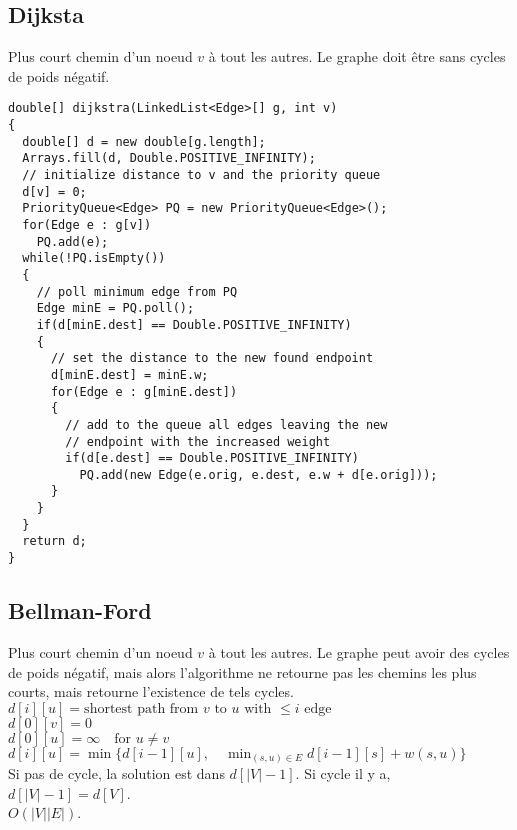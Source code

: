 \subsection{Dijksta}
Plus court chemin d'un noeud $v$ à tout les autres. Le graphe doit être sans cycles de poids négatif.\\

\begin{lstlisting}
double[] dijkstra(LinkedList<Edge>[] g, int v)
{
  double[] d = new double[g.length];
  Arrays.fill(d, Double.POSITIVE_INFINITY);
  // initialize distance to v and the priority queue
  d[v] = 0;
  PriorityQueue<Edge> PQ = new PriorityQueue<Edge>();
  for(Edge e : g[v])
    PQ.add(e);
  while(!PQ.isEmpty())
  {
    // poll minimum edge from PQ
    Edge minE = PQ.poll();
    if(d[minE.dest] == Double.POSITIVE_INFINITY)
    {
      // set the distance to the new found endpoint
      d[minE.dest] = minE.w;
      for(Edge e : g[minE.dest])
      {
        // add to the queue all edges leaving the new
        // endpoint with the increased weight
        if(d[e.dest] == Double.POSITIVE_INFINITY)
          PQ.add(new Edge(e.orig, e.dest, e.w + d[e.orig]));
      }
    }
  }
  return d;
}
\end{lstlisting}
\subsection{Bellman-Ford\label{BellmanFord}}
Plus court chemin d'un noeud $v$ à tout les autres. Le graphe peut avoir des cycles de poids négatif, mais alors l'algorithme ne retourne pas les chemins les plus courts, mais retourne l'existence de tels cycles.\\
$d[i][u] = \text{shortest path from $v$ to $u$ with $\leq i$ edge}$\\
$d[0][v] = 0$ \\
$d[0][u] = \infty \quad \text{for $u \neq v$}$\\
$d[i][u] = \min \{ 
d[i - 1][u], \quad
\min_{(s, u) \in E} d[i - 1][s] + w(s, u) \}$\\
Si pas de cycle, la solution est dans $d[|V|-1]$. Si cycle il y a, $d[|V|-1]=d[V]$.\\
$O(|V||E|)$.\\

